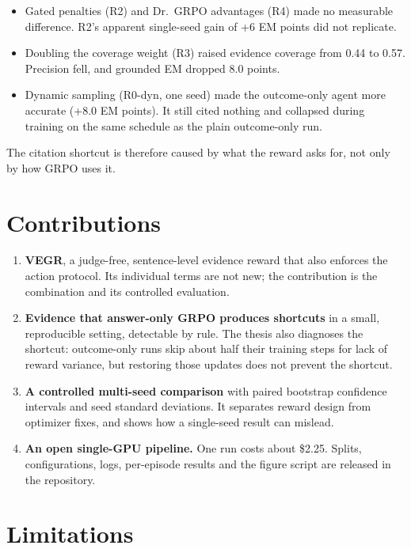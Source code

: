 \begin{itemize}
\tightlist
\item
  Gated penalties (R2) and Dr.~GRPO advantages (R4) made no measurable
  difference. R2's apparent single-seed gain of +6 EM points did not
  replicate.
\item
  Doubling the coverage weight (R3) raised evidence coverage from 0.44
  to 0.57. Precision fell, and grounded EM dropped 8.0 points.
\item
  Dynamic sampling (R0-dyn, one seed) made the outcome-only agent more
  accurate (+8.0 EM points). It still cited nothing and collapsed during
  training on the same schedule as the plain outcome-only run.
\end{itemize}

The citation shortcut is therefore caused by what the reward asks for,
not only by how GRPO uses it.

\section{Contributions}\label{sec:5.2}

\begin{enumerate}
\def\labelenumi{\arabic{enumi}.}
\tightlist
\item
  \textbf{VEGR}, a judge-free, sentence-level evidence reward that also
  enforces the action protocol. Its individual terms are not new; the
  contribution is the combination and its controlled evaluation.
\item
  \textbf{Evidence that answer-only GRPO produces shortcuts} in a small,
  reproducible setting, detectable by rule. The thesis also diagnoses
  the shortcut: outcome-only runs skip about half their training steps
  for lack of reward variance, but restoring those updates does not
  prevent the shortcut.
\item
  \textbf{A controlled multi-seed comparison} with paired bootstrap
  confidence intervals and seed standard deviations. It separates reward
  design from optimizer fixes, and shows how a single-seed result can
  mislead.
\item
  \textbf{An open single-GPU pipeline.} One run costs about \$2.25.
  Splits, configurations, logs, per-episode results and the figure
  script are released in the repository.
\end{enumerate}

\section{Limitations}\label{sec:5.3}

